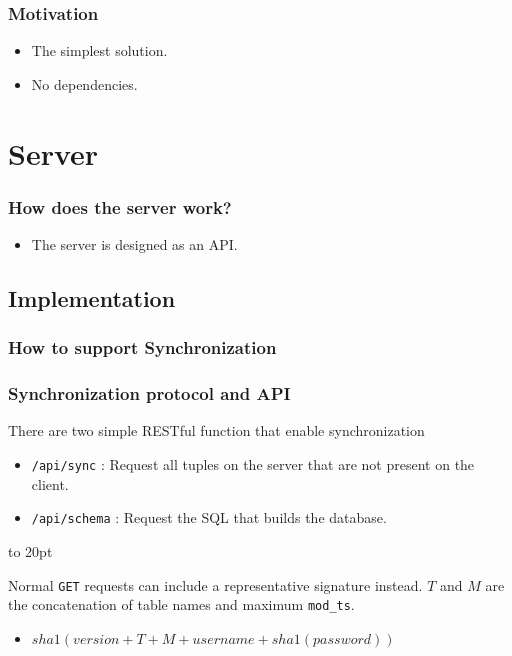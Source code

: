 \documentclass[]{beamer}
\newcommand{\pad}{\vbox to 20pt{}}
\begin{document}
\begin{frame}
\frametitle{Motivation}
\begin{itemize}
\item The simplest solution.
\item No dependencies.
\end{itemize}

\end{frame}




\section{Server}

\begin{frame}
\frametitle{How does the server work?}

\begin{itemize}
\item The server is designed as an API.
\end{itemize}

\end{frame}







\subsection{Implementation}

\begin{frame}
\frametitle{How to support Synchronization}

\frametitle{Synchronization protocol and API}

There are two simple RESTful function that enable synchronization

\begin{itemize}
\item \texttt{/api/sync} : Request all tuples on the server that are not present on the client.
\item \texttt{/api/schema} : Request the SQL that builds the database.
\end{itemize}

\pad

Normal \texttt{GET} requests can include a representative signature instead. $T$ and $M$ are the concatenation of table names and maximum \texttt{mod\_ts}.
\begin{itemize}
\item \textit{$sha1(version + T + M + username + sha1(password))$}
\end{itemize}

\end{frame}
\end{document}
